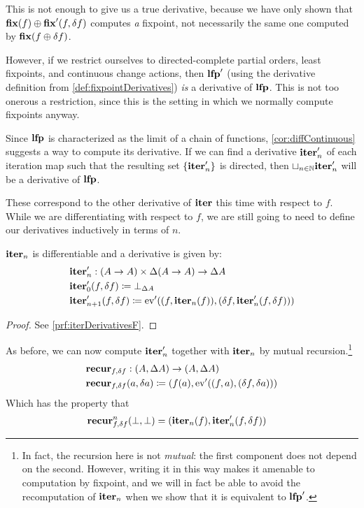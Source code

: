 This is not enough to give us a true derivative, because we have only shown
that $\mathbf{fix}(f) \oplus \mathbf{fix}'(f, \delta f)$ computes \emph{a} fixpoint, not necessarily
the same one computed by $\mathbf{fix}{(f \oplus \delta f)}$.

However, if we restrict ourselves to directed-complete partial orders, least
fixpoints, and continuous change actions, then $\mathbf{lfp}'$ (using the
derivative definition from \cref{def:fixpointDerivatives}) \emph{is} a
derivative of $\mathbf{lfp}$. This is not too onerous a restriction, since this is
the setting in which we normally compute fixpoints anyway.

Since $\mathbf{lfp}$ is characterized as the limit of a chain of functions,
\cref{cor:diffContinuous} suggests a way to compute its derivative. If we can find a derivative
$\mathbf{iter}_n'$ of each iteration map 
such that the resulting set $\{ \mathbf{iter}_n' \}$ is directed, then $\sqcup_{n \in \mathbb{N}}\mathbf{iter}_n'$ will be a derivative of $\mathbf{lfp}$.

These correspond to the other derivative of $\mathbf{iter}$ \textemdash{} this time with respect to
$f$. While we are differentiating with respect to $f$, we are still going to
need to define our derivatives inductively in terms of $n$.

\begin{prop}[name=Derivative of the iteration map with respect to $f$, restate=iterDerivativesF]
  \label{prop:iterDerivativesF}
  $\mathbf{iter}_n$ is differentiable and a derivative is given by:
  \begin{align*}
    &\mathbf{iter}_n' : (A \rightarrow A) \times \Delta (A \rightarrow A) \rightarrow \Delta A\\
    &\mathbf{iter}_0' (f, \delta f) \coloneqq \bot_{\Delta A}\\
    &\mathbf{iter}_{n+1}' (f, \delta f) \coloneqq \operatorname{ev}'((f, \mathbf{iter}_n(f)), (\delta f, \mathbf{iter}_n'(f, \delta f)))
  \end{align*}
\end{prop}
\ifproofs
\begin{proof}
  See \cref{prf:iterDerivativesF}.
\end{proof}
\fi

As before, we can now compute $\mathbf{iter}_n'$ together with $\mathbf{iter}_n$ by
mutual recursion.\footnote{
  In fact, the recursion here is not \emph{mutual}: the first component does not
  depend on the second. However, writing it in this way makes it
  amenable to computation by fixpoint, and we will in fact be able to avoid the
  recomputation of $\mathbf{iter}_n$ when we show that it is equivalent to $\mathbf{lfp}'$.
}
\begin{align*}
  &\mathbf{recur}_{f, \delta f} : (A, \Delta A) \rightarrow (A, \Delta A)\\
  &\mathbf{recur}_{f, \delta f} (a, \delta a) \coloneqq (f(a), \operatorname{ev}'((f, a), (\delta f, \delta a)))
\end{align*}
Which has the property that
\begin{align*}
  &\mathbf{recur}_{f, \delta f}^n (\bot, \bot) = (\mathbf{iter}_n(f), \mathbf{iter}_n'(f, \delta f))
\end{align*}

